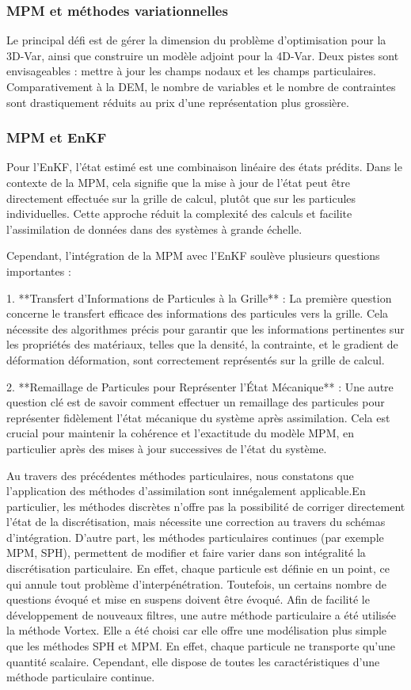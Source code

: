 \subsubsection{MPM et méthodes variationnelles}
Le principal défi est de gérer la dimension du problème d'optimisation pour la 3D-Var, ainsi que construire un modèle adjoint pour la 4D-Var.
Deux pistes sont envisageables : mettre à jour les champs nodaux et les champs particulaires. Comparativement à la DEM, le nombre de variables et le nombre de contraintes sont drastiquement réduits au prix d'une représentation plus grossière.

\subsubsection{MPM et EnKF}
Pour l'EnKF, l'état estimé est une combinaison linéaire des états prédits. Dans le contexte de la MPM, cela signifie que la mise à jour de l'état peut être directement effectuée sur la grille de calcul, plutôt que sur les particules individuelles. Cette approche réduit la complexité des calculs et facilite l'assimilation de données dans des systèmes à grande échelle.

Cependant, l'intégration de la MPM avec l'EnKF soulève plusieurs questions importantes :

1. **Transfert d'Informations de Particules à la Grille** : La première question concerne le transfert efficace des informations des particules vers la grille. Cela nécessite des algorithmes précis pour garantir que les informations pertinentes sur les propriétés des matériaux, telles que la densité, la contrainte, et le gradient de déformation déformation, sont correctement représentés sur la grille de calcul.

2. **Remaillage de Particules pour Représenter l'État Mécanique** : Une autre question clé est de savoir comment effectuer un remaillage des particules pour représenter fidèlement l'état mécanique du système après assimilation. Cela est crucial pour maintenir la cohérence et l'exactitude du modèle MPM, en particulier après des mises à jour successives de l'état du système.

Au travers des précédentes méthodes particulaires, nous constatons que l'application des méthodes d'assimilation sont innégalement applicable.En particulier, les méthodes discrètes n'offre pas la possibilité de corriger directement l'état de la discrétisation, mais nécessite une correction au travers du schémas d'intégration. D'autre part, les méthodes particulaires continues (par exemple MPM, SPH), permettent de modifier et faire varier dans son intégralité la discrétisation particulaire. En effet, chaque particule est définie en un point, ce qui annule tout problème d'interpénétration. Toutefois, un certains nombre de questions évoqué et mise en suspens doivent être évoqué.
Afin de facilité le développement de nouveaux filtres, une autre méthode particulaire a été utilisée la méthode Vortex. Elle a été choisi car elle offre une modélisation plus simple que les méthodes SPH et MPM. En effet, chaque particule ne transporte qu'une quantité scalaire. Cependant, elle dispose de toutes les caractéristiques d'une méthode particulaire continue.

